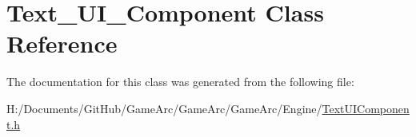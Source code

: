 \hypertarget{class_text___u_i___component}{\section{Text\+\_\+\+U\+I\+\_\+\+Component Class Reference}
\label{class_text___u_i___component}
}


The documentation for this class was generated from the following file\+:\begin{DoxyCompactItemize}
\item 
H\+:/\+Documents/\+Git\+Hub/\+Game\+Arc/\+Game\+Arc/\+Game\+Arc/\+Engine/\hyperlink{_text_u_i_component_8h}{Text\+U\+I\+Component.\+h}\end{DoxyCompactItemize}
